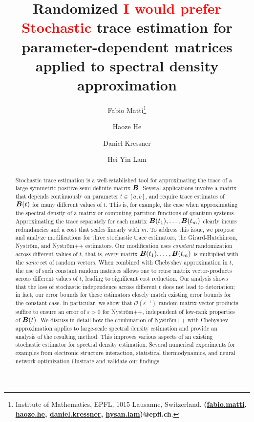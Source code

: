 \documentclass[11pt]{article}
\title{Randomized \textcolor{red}{I would prefer Stochastic} trace estimation for parameter-dependent matrices applied to spectral density approximation}
\author{Fabio Matti\thanks{Institute of Mathematics, EPFL, 1015 Lausanne, Switzerland. {\textbf{(\href{mailto:fabio.matti@epfl.ch}{fabio.matti}, \href{mailto:haoze.he@epfl.ch}{haoze.he}, \href{mailto:daniel.kressner@epfl.ch}{daniel.kressner}, \href{mailto:hysan.lam@epfl.ch}{hysan.lam})@epfl.ch}}.}
\and Haoze He\footnotemark[1]
\and Daniel Kressner\footnotemark[1]
\and Hei Yin Lam\footnotemark[1]}
\begin{document}
\maketitle



\begin{abstract}
    Stochastic trace estimation is a well-established tool for approximating the trace of a large symmetric positive semi-definite matrix $\boldsymbol{B}$. Several applications involve a matrix that depends continuously on parameter $t \in [a,b]$, and require trace estimates of $\boldsymbol{B}(t)$ for many different values of $t$. This is, for example, the case when approximating the spectral density of a matrix or computing partition functions of quantum systems. Approximating the trace separately for each matrix
    $\boldsymbol{B}(t_1), \dots, \boldsymbol{B}(t_m)$ clearly incurs redundancies and a cost that scales linearly with $m$. To address this issue, we propose and analyze modifications for three stochastic trace estimators, the Girard-Hutchinson, Nyström, and Nyström++ estimators. Our modification uses \emph{constant} randomization across different values of $t$, that is,
    every matrix $\boldsymbol{B}(t_1), \dots, \boldsymbol{B}(t_m)$ is multiplied with the \emph{same} set of random vectors.
    When combined with Chebyshev approximation in $t$, the use of such constant random matrices allows one to reuse matrix vector-products across different values of $t$, leading to significant cost reduction.
    Our analysis shows that the loss of stochastic independence across different $t$ does not lead to detoriation; in fact, our error bounds for these estimators closely match existing error bounds for the constant case. In particular, we show that $\mathcal{O}(\varepsilon^{-1})$ random matrix-vector products suffice to ensure an error of $\varepsilon > 0$ for Nyström++, independent of low-rank properties of $\boldsymbol{B}(t)$. We discuss in detail how the combination of Nyström++ with 
    Chebyshev approximation applies to large-scale spectral density estimation and provide an analysis of the resulting method. This  improves various aspects of an existing stochastic estimator for spectral density estimation. Several numerical experiments for examples from electronic structure interaction, statistical thermodynamics, and neural network optimization illustrate and validate our findings.
\end{abstract}
\end{document}

